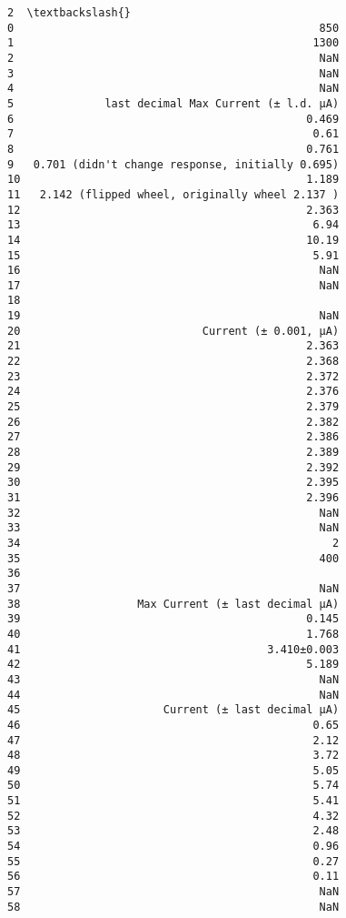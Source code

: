 \documentclass[11pt]{article}
\begin{document}
\begin{tcolorbox}[breakable, size=fbox, boxrule=.5pt, pad at break*=1mm, opacityfill=0]
\begin{Verbatim}[commandchars=\\\{\}]
                                                  2  \textbackslash{}
0                                               850
1                                              1300
2                                               NaN
3                                               NaN
4                                               NaN
5              last decimal Max Current (± l.d. μA)
6                                             0.469
7                                              0.61
8                                             0.761
9   0.701 (didn't change response, initially 0.695)
10                                            1.189
11   2.142 (flipped wheel, originally wheel 2.137 )
12                                            2.363
13                                             6.94
14                                            10.19
15                                             5.91
16                                              NaN
17                                              NaN
18                                                ﻿
19                                              NaN
20                            Current (± 0.001, μA)
21                                            2.363
22                                            2.368
23                                            2.372
24                                            2.376
25                                            2.379
26                                            2.382
27                                            2.386
28                                            2.389
29                                            2.392
30                                            2.395
31                                            2.396
32                                              NaN
33                                              NaN
34                                                2
35                                              400
36                                                ﻿
37                                              NaN
38                  Max Current (± last decimal μA)
39                                            0.145
40                                            1.768
41                                      3.410±0.003
42                                            5.189
43                                              NaN
44                                              NaN
45                      Current (± last decimal μA)
46                                             0.65
47                                             2.12
48                                             3.72
49                                             5.05
50                                             5.74
51                                             5.41
52                                             4.32
53                                             2.48
54                                             0.96
55                                             0.27
56                                             0.11
57                                              NaN
58                                              NaN


\end{Verbatim}
\end{tcolorbox}
\end{document}
